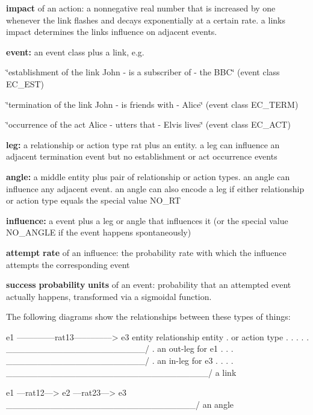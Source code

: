\begin{DoxyItemize}
\item {\bfseries impact} of an action\+: a nonnegative real number that is increased by one whenever the link flashes and decays exponentially at a certain rate. a link\textquotesingle{}s impact determines the link\textquotesingle{}s influence on adjacent events.
\item {\bfseries event\+:} an event class plus a link, e.\+g.
\begin{DoxyItemize}
\item \char`\"{}establishment of the link \textquotesingle{}\+John -\/ is a subscriber of -\/ the B\+B\+C\textquotesingle{}\char`\"{} (event class E\+C\+\_\+\+E\+ST)
\item \char`\"{}termination of the link \textquotesingle{}\+John -\/ is friends with -\/ Alice\textquotesingle{}\char`\"{} (event class E\+C\+\_\+\+T\+E\+RM)
\item \char`\"{}occurrence of the act \textquotesingle{}\+Alice -\/ utters that -\/ Elvis lives\textquotesingle{}\char`\"{} (event class E\+C\+\_\+\+A\+CT)
\end{DoxyItemize}
\item {\bfseries leg\+:} a relationship or action type rat plus an entity. a leg can influence an adjacent termination event but no establishment or act occurrence events
\item {\bfseries angle\+:} a middle entity plus pair of relationship or action types. an angle can influence any adjacent event. an angle can also encode a leg if either relationship or action type equals the special value N\+O\+\_\+\+RT
\item {\bfseries influence\+:} a event plus a leg or angle that influences it (or the special value N\+O\+\_\+\+A\+N\+G\+LE if the event happens spontaneously)
\item {\bfseries attempt} {\bfseries rate} of an influence\+: the probability rate with which the influence attempts the corresponding event
\item {\bfseries success} {\bfseries probability} {\bfseries units} of an event\+: probability that an attempted event actually happens, transformed via a sigmoidal function.
\end{DoxyItemize}

The following diagrams show the relationships between these types of things\+: \begin{DoxyVerb}  e1 –––––––––rat13–––––––––> e3
entity     relationship     entity
  .       or action type       .
  .             .              .
  .       \______________________/
  .           an out-leg for e1
  .             .              .
\______________________/       .
    an in-leg for e3           .
  .             .              .
\________________________________/
              a link


  e1 ––rat12––> e2 ––rat23––> e3
 \______________________________/
             an angle
\end{DoxyVerb}


